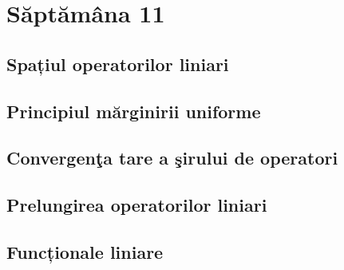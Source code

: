 \documentclass[a4paper,12pt]{article}
\theoremstyle{change}
\begin{document}
\section{Săptămâna 11}


\subsection{Spațiul operatorilor liniari}

\subsection{Principiul mărginirii uniforme}


\subsection{Convergenţa tare a şirului de operatori}

\subsection{Prelungirea operatorilor liniari}


\subsection{Funcționale liniare}
\end{document}
